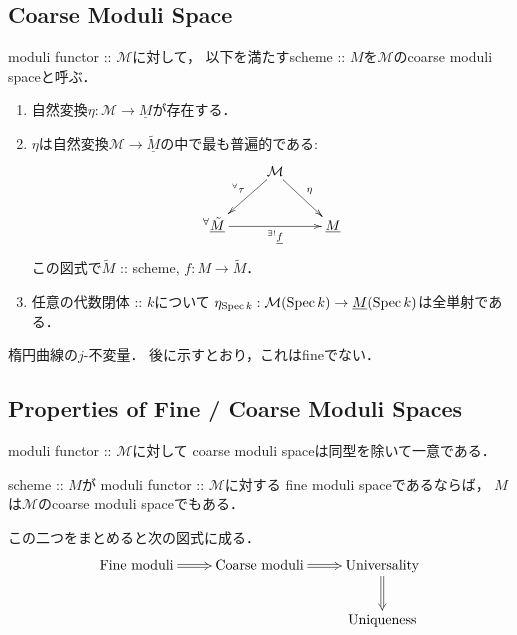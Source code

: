 \documentclass[a4paper]{jsarticle}
\newcommand{\func}[1]{\underline{#1}}
\newcommand{\ftorM}{\mathcal{M}}
\begin{document}
    \subsection{Coarse Moduli Space}
    \begin{Def}
        moduli functor :: $\ftorM$に対して，
        以下を満たすscheme :: $M$を$\ftorM$のcoarse moduli spaceと呼ぶ．
        \begin{enumerate}[label=(\roman*), leftmargin=*]
            \item
                自然変換$\eta: \ftorM \to \func{M}$が存在する．
            \item
                $\eta$は自然変換$\ftorM \to \func{\tilde{M}}$の中で最も普遍的である:
                \[
                \xymatrix
                {
                    {} & \ar[ld]_-{{}^{\forall} \tau}\ftorM \ar[rd]^-{\eta}& {} \\
                    {}^{\forall}\func{\tilde{M}} \ar[rr]_-{{}^{\exists!} \func{f}}& {} & \func{M}
                }
                \]
                この図式で$\tilde{M}$ :: scheme, $f: M \to \tilde{M}$．
            \item
                任意の代数閉体 :: $k$について
                $\eta_{\Spec k}: \ftorM(\Spec k) \to \func{M}(\Spec k)$は全単射である．
        \end{enumerate}
    \end{Def}

    \begin{Example}
        楕円曲線の$j$-不変量．
        後に示すとおり，これはfineでない．
    \end{Example}

    \subsection{Properties of Fine / Coarse Moduli Spaces}
    \begin{Prop}
        moduli functor :: $\ftorM$に対して
        coarse moduli spaceは同型を除いて一意である．
    \end{Prop}

    \begin{Prop}
        scheme :: $M$が
        moduli functor :: $\ftorM$に対する
        fine moduli spaceであるならば，
        $M$は$\ftorM$のcoarse moduli spaceでもある．
    \end{Prop}
    この二つをまとめると次の図式に成る．
    \[\xymatrix{
        \text{Fine moduli} \ar@{=>}[r]& \text{Coarse moduli} \ar@{=>}[r]& \text{Universality} \ar@{=>}[d]\\
        {} & {} & \text{Uniqueness}
    }\]
    
\end{document}
